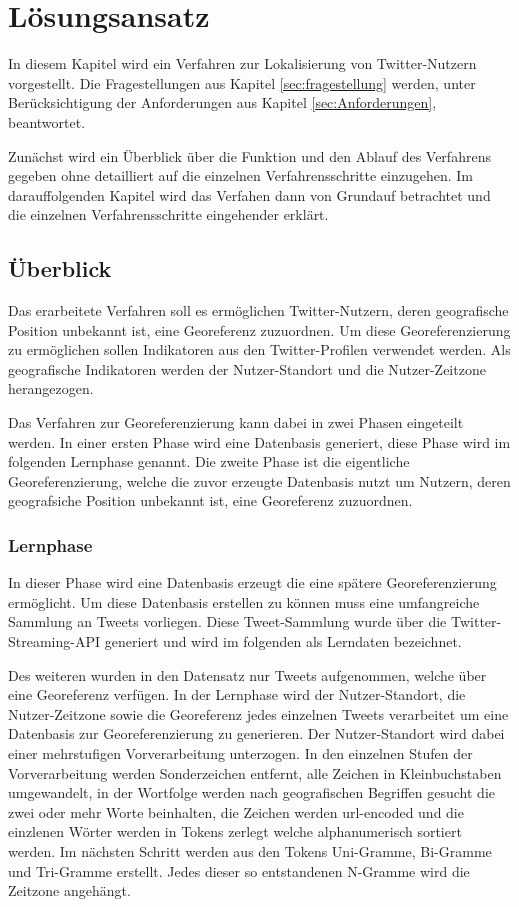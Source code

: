 \chapter{Lösungsansatz} \label{chp:Loesungsansatz}
In diesem Kapitel wird ein Verfahren zur Lokalisierung von Twitter-Nutzern vorgestellt.
Die Fragestellungen aus Kapitel \ref{sec:fragestellung} werden, unter Berücksichtigung der Anforderungen aus Kapitel \ref{sec:Anforderungen}, beantwortet.  

Zunächst wird ein Überblick über die Funktion und den Ablauf des Verfahrens gegeben ohne detailliert auf die einzelnen Verfahrensschritte einzugehen.
Im darauffolgenden Kapitel wird das Verfahen dann von Grundauf betrachtet und die einzelnen Verfahrensschritte eingehender erklärt. 


	\section{Überblick}
	Das erarbeitete Verfahren soll es ermöglichen Twitter-Nutzern, deren geografische Position unbekannt ist, eine Georeferenz zuzuordnen.
	Um diese Georeferenzierung zu ermöglichen sollen Indikatoren aus den Twitter-Profilen verwendet werden. 
	Als geografische Indikatoren werden der Nutzer-Standort und die Nutzer-Zeitzone herangezogen.

	Das Verfahren zur Georeferenzierung kann dabei in zwei Phasen eingeteilt werden.
	In einer ersten Phase wird eine Datenbasis generiert, diese Phase wird im folgenden Lernphase genannt. 
	Die zweite Phase ist die eigentliche Georeferenzierung, welche die zuvor erzeugte Datenbasis nutzt um Nutzern, deren geografsiche Position unbekannt ist, eine Georeferenz zuzuordnen. 

	\subsection{Lernphase}
	In dieser Phase wird eine Datenbasis erzeugt die eine spätere Georeferenzierung ermöglicht. 
	Um diese Datenbasis erstellen zu können muss eine umfangreiche Sammlung an Tweets vorliegen.
	Diese Tweet-Sammlung wurde über die Twitter-Streaming-API generiert und wird im folgenden als Lerndaten bezeichnet.  
	 
	Des weiteren wurden in den Datensatz nur Tweets aufgenommen, welche über eine Georeferenz verfügen. 
	In der Lernphase wird der Nutzer-Standort, die Nutzer-Zeitzone sowie die Georeferenz jedes einzelnen Tweets verarbeitet um eine Datenbasis zur Georeferenzierung zu generieren. 
	Der Nutzer-Standort wird dabei einer mehrstufigen Vorverarbeitung unterzogen.
	In den einzelnen Stufen der Vorverarbeitung werden Sonderzeichen entfernt, alle Zeichen in Kleinbuchstaben umgewandelt, in der Wortfolge werden nach geografischen Begriffen gesucht die zwei oder mehr Worte beinhalten, die Zeichen werden url-encoded und die einzlenen Wörter werden in Tokens zerlegt welche alphanumerisch sortiert werden.
	Im nächsten Schritt werden aus den Tokens Uni-Gramme, Bi-Gramme und Tri-Gramme erstellt. 
	Jedes dieser so entstandenen N-Gramme wird die Zeitzone angehängt.  

